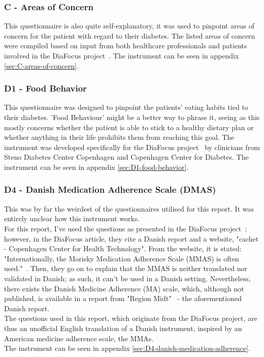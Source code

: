 \subsubsection*{C - Areas of Concern}
This questionnaire is also quite self-explanatory, it was used to pinpoint areas of concern for the patient with regard to their diabetes. The listed areas of concern were compiled based on input from both healthcare professionals and patients involved in the DiaFocus project~\cite{DiaFocus}. The instrument can be seen in appendix \autoref{sec:C-areas-of-concern}.

\subsubsection*{D1 - Food Behavior}
This questionnaire was designed to pinpoint the patients' eating habits tied to their diabetes. 'Food Behaviour' might be a better way to phrase it, seeing as this mostly concerns whether the patient is able to stick to a healthy dietary plan or whether anything in their life prohibits them from reaching this goal. The instrument was developed specifically for the DiaFocus project~\cite{DiaFocus} by clinicians from Steno Diabetes Center Copenhagen and Copenhagen Center for Diabetes. The instrument can be seen in appendix \autoref{sec:D1-food-behavior}.

\subsubsection*{D4 - Danish Medication Adherence Scale (DMAS)}
This was by far the weirdest of the questionnaires utilised for this report. It was entirely unclear how this instrument works.
\\
For this report, I've used the questions as presented in the DiaFocus project~\cite{DiaFocus}; however, in the DiaFocus article, they cite a Danish report and a website, "cachet - Copenhagen Center for Health Technology". From the website, it is stated: "Internationally, the Morisky Medication Adherence Scale (MMAS) is often used."~\cite{cachet-CCHT}. Then, they go on to explain that the MMAS is neither translated nor validated in Danish; as such, it can't be used in a Danish setting. Nevertheless, there exists the Danish Medicine Adherence (MA) scale, which, although not published, is available in a report from "Region Midt"~\cite{Danish-Medicine-Adherence-Scale} - the aforementioned Danish report.
\\
The questions used in this report, which originate from the DiaFocus project, are thus an unofficial English translation of a Danish instrument, inspired by an American medicine adherence scale, the MMAs.
\\
The instrument can be seen in appendix \autoref{sec:D4-danish-medication-adherence}.

